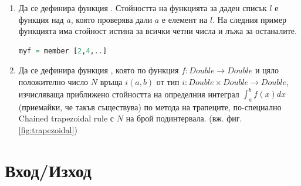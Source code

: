 \begin{enumerate}[]
\item Да се дефинира функция . Стойността на функцията за даден списък $l$ е функция над $a$, която проверява дали $a$ е елемент на $l$. На следния пример функцията  има стойност истина за всички четни числа и лъжа за останалите.

\begin{lstlisting}[basicstyle=\small,language=Haskell]
myf = member [2,4,..]
\end{lstlisting}

\item Да се дефинира функция , която по функция $f: Double \rightarrow Double$ и цяло положително число $N$ връща $i(a,b)$ от тип $i:Double \times Double \rightarrow Double$, изчисляваща приближено стойността на определния интеграл $\int_{a}^{b} f(x) dx$ (приемайки, че такъв съществува) по метода на трапеците, по-специално Chained trapezoidal rule\cite{trapezoidal} с $N$ на брой подинтервала. (вж. фиг. \ref{fig:trapezoidal})

\end{enumerate}

\section {Вход/Изход}


